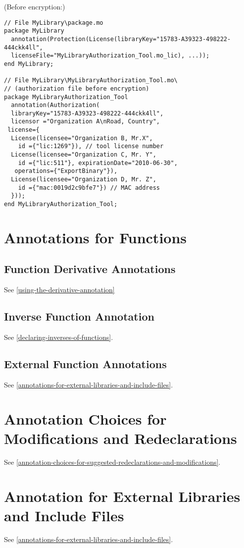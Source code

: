 \begin{example}
(Before encryption:)
\begin{lstlisting}[language=modelica]
// File MyLibrary\package.mo
package MyLibrary
  annotation(Protection(License(libraryKey="15783-A39323-498222-444ckk4ll",
  licenseFile="MyLibraryAuthorization_Tool.mo_lic), ...));
end MyLibrary;

// File MyLibrary\MyLibraryAuthorization_Tool.mo\
// (authorization file before encryption)
package MyLibraryAuthorization_Tool
  annotation(Authorization(
  libraryKey="15783-A39323-498222-444ckk4ll",
  licensor ="Organization A\nRoad, Country",
 license={
  License(licensee="Organization B, Mr.X",
    id ={"lic:1269"}), // tool license number
  License(licensee="Organization C, Mr. Y",
    id ={"lic:511"}, expirationDate="2010-06-30",
   operations={"ExportBinary"}),
  License(licensee="Organization D, Mr. Z",
    id ={"mac:0019d2c9bfe7"}) // MAC address
  }));
end MyLibraryAuthorization_Tool;
\end{lstlisting}
\end{example}

\section{Annotations for Functions}

\subsection{Function Derivative Annotations}

See \autoref{using-the-derivative-annotation}

\subsection{Inverse Function Annotation}

See \autoref{declaring-inverses-of-functions}.

\subsection{External Function Annotations}

See \autoref{annotations-for-external-libraries-and-include-files}.

\section{Annotation Choices for Modifications and Redeclarations}

See \autoref{annotation-choices-for-suggested-redeclarations-and-modifications}.

\section{Annotation for External Libraries and Include Files}

See \autoref{annotations-for-external-libraries-and-include-files}.
